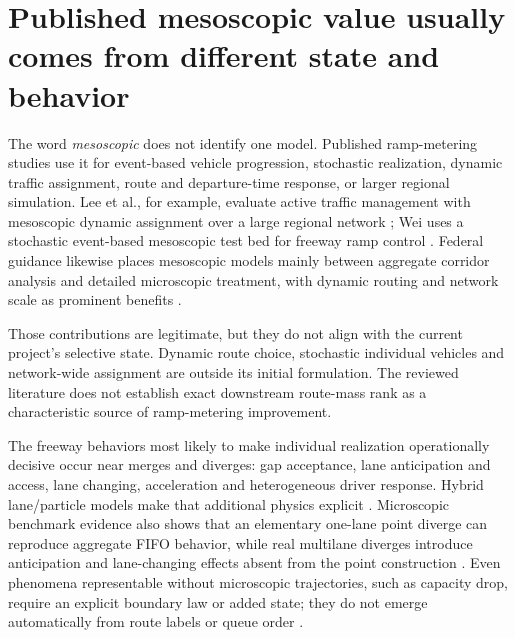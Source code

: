 \documentclass[10pt]{article}
\begin{document}
\section{Published mesoscopic value usually comes from different state and behavior}

The word \emph{mesoscopic} does not identify one model. Published ramp-metering studies use it for event-based vehicle progression, stochastic realization, dynamic traffic assignment, route and departure-time response, or larger regional simulation. Lee et al., for example, evaluate active traffic management with mesoscopic dynamic assignment over a large regional network \cite{lee2019}; Wei uses a stochastic event-based mesoscopic test bed for freeway ramp control \cite{wei2001}. Federal guidance likewise places mesoscopic models mainly between aggregate corridor analysis and detailed microscopic treatment, with dynamic routing and network scale as prominent benefits \cite{fhwa2013}.

Those contributions are legitimate, but they do not align with the current project's selective state. Dynamic route choice, stochastic individual vehicles and network-wide assignment are outside its initial formulation. The reviewed literature does not establish exact downstream route-mass rank as a characteristic source of ramp-metering improvement.

The freeway behaviors most likely to make individual realization operationally decisive occur near merges and diverges: gap acceptance, lane anticipation and access, lane changing, acceleration and heterogeneous driver response. Hybrid lane/particle models make that additional physics explicit \cite{laval2004}. Microscopic benchmark evidence also shows that an elementary one-lane point diverge can reproduce aggregate FIFO behavior, while real multilane diverges introduce anticipation and lane-changing effects absent from the point construction \cite{boukhellouf2023}. Even phenomena representable without microscopic trajectories, such as capacity drop, require an explicit boundary law or added state; they do not emerge automatically from route labels or queue order \cite{jin2013}.
\end{document}
